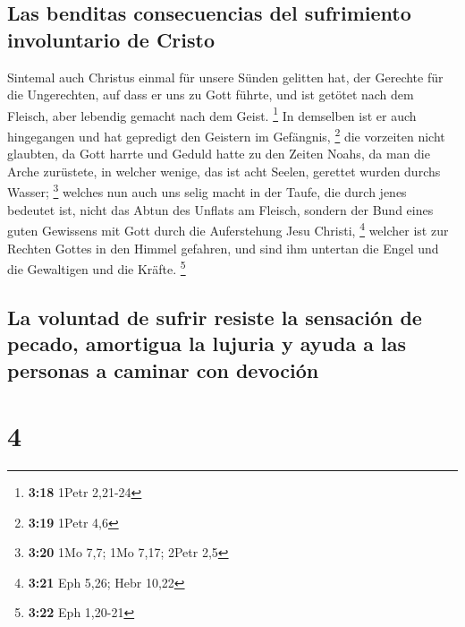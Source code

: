 \hypertarget{las-benditas-consecuencias-del-sufrimiento-involuntario-de-cristo}{%
\subsection{Las benditas consecuencias del sufrimiento involuntario de
Cristo}\label{las-benditas-consecuencias-del-sufrimiento-involuntario-de-cristo}}

 Sintemal auch Christus einmal für unsere Sünden gelitten
hat, der Gerechte für die Ungerechten, auf dass er uns zu Gott führte,
und ist getötet nach dem Fleisch, aber lebendig gemacht nach dem Geist.
\footnote{\textbf{3:18} 1Petr 2,21-24}  In demselben ist
er auch hingegangen und hat gepredigt den Geistern im Gefängnis,
\footnote{\textbf{3:19} 1Petr 4,6}  die vorzeiten nicht
glaubten, da Gott harrte und Geduld hatte zu den Zeiten Noahs, da man
die Arche zurüstete, in welcher wenige, das ist acht Seelen, gerettet
wurden durchs Wasser; \footnote{\textbf{3:20} 1Mo 7,7; 1Mo 7,17; 2Petr
  2,5}  welches nun auch uns selig macht in der Taufe,
die durch jenes bedeutet ist, nicht das Abtun des Unflats am Fleisch,
sondern der Bund eines guten Gewissens mit Gott durch die Auferstehung
Jesu Christi, \footnote{\textbf{3:21} Eph 5,26; Hebr 10,22}
 welcher ist zur Rechten Gottes in den Himmel gefahren,
und sind ihm untertan die Engel und die Gewaltigen und die Kräfte.
\footnote{\textbf{3:22} Eph 1,20-21}

\hypertarget{la-voluntad-de-sufrir-resiste-la-sensaciuxf3n-de-pecado-amortigua-la-lujuria-y-ayuda-a-las-personas-a-caminar-con-devociuxf3n}{%
\subsection{La voluntad de sufrir resiste la sensación de pecado,
amortigua la lujuria y ayuda a las personas a caminar con
devoción}\label{la-voluntad-de-sufrir-resiste-la-sensaciuxf3n-de-pecado-amortigua-la-lujuria-y-ayuda-a-las-personas-a-caminar-con-devociuxf3n}}

\hypertarget{section-3}{%
\section{4}\label{section-3}}

